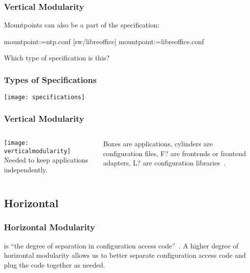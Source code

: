 \begin{frame}[fragile]
	\frametitle{Vertical Modularity \cite{raab2016improving}}
	Mountpoints can also be a part of the specification:

	\begin{code}[language=Cpp,gobble=4,showspaces=no]
	[ntp]
	  mountpoint:=ntp.conf
	[sw/libreoffice]
	  mountpoint:=libreoffice.conf
	\end{code}

	\begin{task}
	Which type of specification is this?
	\end{task}
\end{frame}

\begin{frame}
	\frametitle{Types of Specifications}
	\texttt{[image: specifications]}
\end{frame}

\begin{frame}
	\frametitle{Vertical Modularity}
	\begin{columns}[c]
	\column{7cm}
	\texttt{[image: verticalmodularity]}
	\column{4cm}
	Needed to keep applications independently.

	Boxes are applications, cylinders are configuration files, F? are frontends or frontend adapters, L? are configuration libraries~\cite{raab2016improving}.
	\end{columns}
\end{frame}



\subsection{Horizontal}

\begin{frame}
	\frametitle{Horizontal Modularity \cite{raab2016improving}}

	 is ``the degree of separation in configuration access code''~\cite{raab2016improving}. 
	A higher degree of horizontal modularity allows us to better separate configuration access code and plug the code together as needed.
\end{frame}

